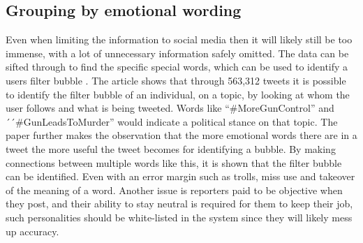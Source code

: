 \subsection{Grouping by emotional wording}
Even when limiting the information to social media then it will likely still be
too immense, with a lot of unnecessary information safely omitted. The data can
be sifted through to find the specific special words, which can be used to
identify a users filter bubble \citep{EmotionalWords}. The article shows that
through 563,312 tweets it is possible to identify the filter bubble of an
individual, on a topic, by looking at whom the user follows and what is being
tweeted. Words like ``\#MoreGunControl'' and  ´´\#GunLeadsToMurder'' would
indicate a political stance on that topic. The paper further makes the
observation that the more emotional words there are in a tweet the more useful
the tweet becomes for identifying a bubble. By making connections between
multiple words like this, it is shown that the filter bubble can be identified.
Even with an error margin such as trolls, miss use and takeover of the meaning
of a word. Another issue is reporters paid to be objective when they post, and
their ability to stay neutral is required for them to keep their job, such
personalities should be white-listed in the system since they will likely mess
up accuracy.